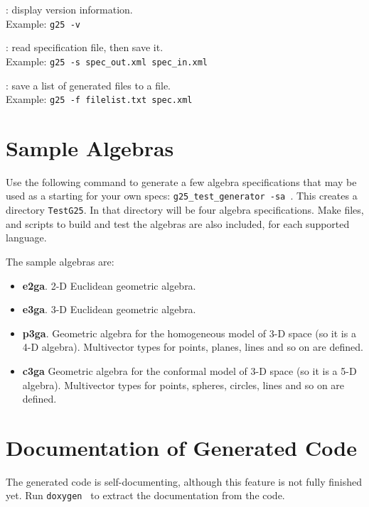 \documentclass[10pt, a4paper]{article}
\begin{document}
\vspace*{2mm}

: display version information.\\
Example: {\tt g25 -v}

\vspace*{2mm}

: read specification file, then save it.\\
Example: {\tt g25 -s spec\_out.xml spec\_in.xml}

\vspace*{2mm}

: save a list of generated files to a file.\\
Example: {\tt g25 -f filelist.txt spec.xml}

\section{Sample Algebras}
\label{s:sample_algebras}

Use the following command to generate a few algebra specifications that may be used
as a starting for your own specs: {\tt g25\_test\_generator -sa }.
This creates a directory {\tt TestG25}. In that directory will be four algebra specifications.
Make files, and scripts to build and test the algebras are also included, for each supported
language.

The sample algebras are:
\begin{itemize}
\item {\bf e2ga}. 2-D Euclidean geometric algebra.
\item {\bf e3ga}. 3-D Euclidean geometric algebra.
\item {\bf p3ga}. Geometric algebra for the homogeneous model of 3-D space (so it is a 4-D algebra).
Multivector types for points, planes, lines and so on are defined.
\item {\bf c3ga} Geometric algebra for the conformal model of 3-D space (so it is a 5-D algebra).
Multivector types for points, spheres, circles, lines and so on are defined.
\end{itemize}

\section{Documentation of Generated Code}

The generated code is self-documenting, although this
feature is not fully finished yet. Run {\tt doxygen } to extract
the documentation from the code.
\end{document}
